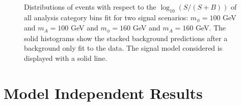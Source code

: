 \begin{figure}[!hbtp]
\centering
\caption{Distributions of events with respect to the $\log_{10}(S/(S+B))$ of all analysis category bins fit for two signal scenarios: $m_{\phi}=100$ GeV and $m_{A}=100$ GeV and $m_{\phi}=160$ GeV and $m_{A}=160$ GeV. The solid histograms show the stacked background predictions after a background only fit to the data. The signal model considered is displayed with a solid line. }
\label{fig:4tau_soversplusb}
\end{figure}

\section{Model Independent Results}

